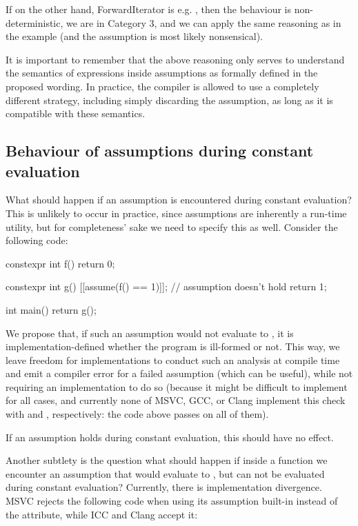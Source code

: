 If on the other hand, ForwardIterator is e.g. , then the behaviour is non-deterministic, we are in Category 3, and we can apply the same reasoning as in the  example (and the assumption is most likely nonsensical).

It is important to remember that the above reasoning only serves to understand the semantics of expressions inside assumptions as formally defined in the proposed wording. In practice, the compiler is allowed to use a completely different strategy, including simply discarding the assumption, as long as it is compatible with these semantics.

\subsection{Behaviour of assumptions during constant evaluation}

What should happen if an assumption is encountered during constant evaluation? This is unlikely to occur in practice, since assumptions are inherently a run-time utility, but for completeness' sake we need to specify this as well. Consider the following code:

\begin{codeblock}
constexpr int f() {
  return 0;
}

constexpr int g() {
  [[assume(f() == 1)]];  // assumption doesn't hold
  return 1;
}

int main() {
  return g();
}
\end{codeblock}

We propose that, if such an assumption would not evaluate to , it is implementation-defined whether the program is ill-formed or not. This way, we leave freedom for implementations to conduct such an analysis at compile time and emit a compiler error for a failed assumption (which can be useful), while not requiring an implementation to do so (because it might be difficult to implement for all cases, and currently none of MSVC, GCC, or Clang implement this check with  and , respectively: the code above passes on all of them).

If an assumption holds during constant evaluation, this should have no effect.

Another subtlety is the question what should happen if inside a  function we encounter an assumption that would evaluate to , but can not be evaluated during constant evaluation? Currently, there is implementation divergence. MSVC rejects the following code when using its assumption built-in instead of the attribute, while ICC and Clang accept it:

